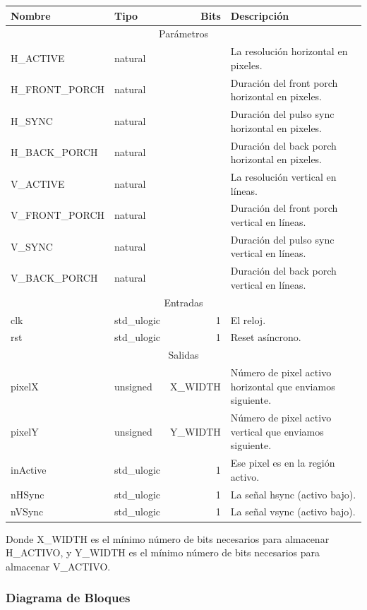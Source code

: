 \documentclass[a4paper]{article}
\begin{document}
\begin{tabular}{| l | l | r | p{8cm} |}
\hline
\textbf{Nombre} & \textbf{Tipo} & \textbf{Bits} & \textbf{Descripción} \\ \hline
\multicolumn{4}{|c|}{Parámetros} \\ \hline
H\_ACTIVE & natural & & La resolución horizontal en pixeles. \\
H\_FRONT\_PORCH & natural & & Duración del front porch horizontal en pixeles. \\
H\_SYNC & natural & & Duración del pulso sync horizontal en pixeles. \\
H\_BACK\_PORCH & natural & & Duración del back porch horizontal en pixeles. \\
V\_ACTIVE & natural & & La resolución vertical en líneas. \\
V\_FRONT\_PORCH & natural & & Duración del front porch vertical en líneas. \\
V\_SYNC & natural & & Duración del pulso sync vertical en líneas. \\
V\_BACK\_PORCH & natural & & Duración del back porch vertical en líneas. \\ \hline
\multicolumn{4}{|c|}{Entradas} \\ \hline
clk & std\_ulogic & 1 & El reloj. \\ 
rst & std\_ulogic & 1 & Reset asíncrono. \\ \hline
\multicolumn{4}{|c|}{Salidas} \\ \hline
pixelX & unsigned & X\_WIDTH & Número de pixel activo horizontal que enviamos siguiente. \\ 
pixelY & unsigned & Y\_WIDTH & Número de pixel activo vertical que enviamos siguiente. \\ 
inActive & std\_ulogic & 1 & Ese pixel es en la región activo. \\
nHSync & std\_ulogic & 1 & La señal hsync (activo bajo). \\
nVSync & std\_ulogic & 1 & La señal vsync (activo bajo). \\
\hline
\end{tabular}

\vspace{0.5cm}
Donde X\_WIDTH es el mínimo número de bits necesarios para almacenar H\_ACTIVO, y Y\_WIDTH es el mínimo número de bits necesarios para almacenar V\_ACTIVO.

\pagebreak
\subsubsection{Diagrama de Bloques}
\end{document}
